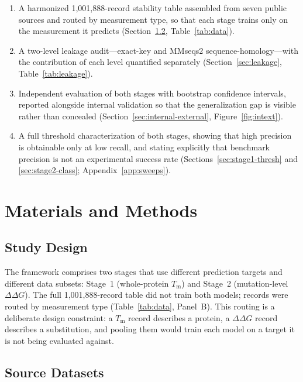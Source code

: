 \documentclass[journal,article,submit,moreauthors]{Definitions/mdpi}
\newcommand{\ddg}{\ensuremath{\Delta\Delta G}}
\newcommand{\Tm}{\ensuremath{T_\mathrm{m}}}
\begin{document}
\begin{enumerate}
\item A harmonized 1{,}001{,}888-record stability table assembled from seven public
      sources and routed by measurement type, so that each stage trains only on the
      measurement it predicts (Section~\ref{sec:sources}, Table~\ref{tab:data}).
\item A two-level leakage audit---exact-key and MMseqs2 sequence-homology---with the
      contribution of each level quantified separately (Section~\ref{sec:leakage},
      Table~\ref{tab:leakage}).
\item Independent evaluation of both stages with bootstrap confidence intervals, reported
      alongside internal validation so that the generalization gap is visible rather than
      concealed (Section~\ref{sec:internal-external}, Figure~\ref{fig:intext}).
\item A full threshold characterization of both stages, showing that high precision is
      obtainable only at low recall, and stating explicitly that benchmark precision is not
      an experimental success rate (Sections~\ref{sec:stage1-thresh} and
      \ref{sec:stage2-class}; Appendix~\ref{app:sweeps}).
\end{enumerate}

\section{Materials and Methods}

\subsection{Study Design}

The framework comprises two stages that use different prediction targets and different
data subsets: Stage~1 (whole-protein \Tm) and Stage~2 (mutation-level \ddg). The full
1{,}001{,}888-record table did not train both models; records were routed by measurement
type (Table~\ref{tab:data}, Panel~B). This routing is a deliberate design constraint: a
\Tm{} record describes a protein, a \ddg{} record describes a substitution, and pooling
them would train each model on a target it is not being evaluated against.

\subsection{Source Datasets}
\label{sec:sources}
\end{document}
